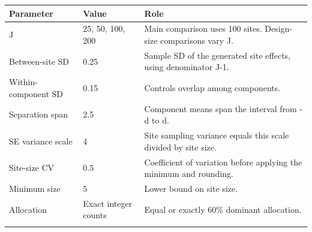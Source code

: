 \begin{longtable}{lll}
\toprule
Parameter & Value & Role \\
\midrule\endhead
J & 25, 50, 100, 200 & Main comparison uses 100 sites. Design-size comparisons vary J. \\ \addlinespace[3pt]
Between-site SD & 0.25 & Sample SD of the generated site effects, using denominator J-1. \\ \addlinespace[3pt]
Within-component SD & 0.15 & Controls overlap among components. \\ \addlinespace[3pt]
Separation span & 2.5 & Component means span the interval from -d to d. \\ \addlinespace[3pt]
SE variance scale & 4 & Site sampling variance equals this scale divided by site size. \\ \addlinespace[3pt]
Site-size CV & 0.5 & Coefficient of variation before applying the minimum and rounding. \\ \addlinespace[3pt]
Minimum size & 5 & Lower bound on site size. \\ \addlinespace[3pt]
Allocation & Exact integer counts & Equal or exactly 60\% dominant allocation. \\ \addlinespace[3pt]
\bottomrule\end{longtable}
